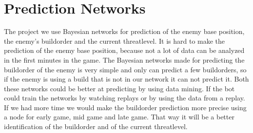 \section{Prediction Networks}
	The project we use Bayesian networks for prediction of the enemy base position, the enemy's buildorder and the current threatlevel. 
	It is hard to make the prediction of the enemy base position, because not a lot of data can be analyzed in the first minutes in the game. 
	The Bayesian networks made for predicting the buildorder of the enemy is very simple and only can predict a few buildorders, so if the enemy is 
	using a build that is not in our network it can not predict it. Both these networks could be better at predicting by using data mining. If the 
	bot could train the networks by watching replays or by using the data from a replay. If we had more time we would make the buildorder prediction 
	more precise using a node for early game, mid game and late game. That way it will be a better identification of the buildorder and of the current 
	threatlevel.